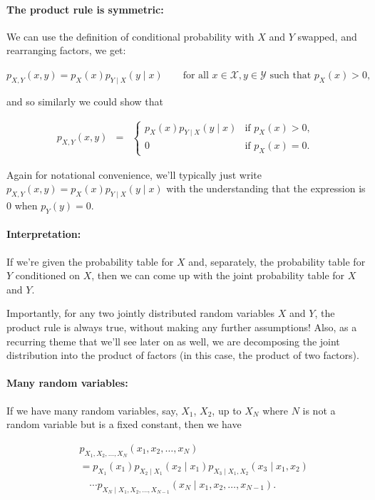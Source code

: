 \documentclass[6008notes.tex]{subfiles}
\begin{document}
\paragraph{The product rule is symmetric:} We can use the definition of conditional probability with $X$ and $Y$ swapped, and rearranging factors, we get:

{\centering$p_{X,Y}(x,y)=p_{X}(x)p_{Y\mid X}(y\mid x)\qquad \text {for all }x\in \mathcal{X},y\in \mathcal{Y}\text { such that }p_{X}(x)>0,$ \par}
 
and so similarly we could show that

\begin{eqnarray*}
p_{X,Y}(x,y)
&=&
\begin{cases}
p_{X}(x)p_{Y\mid X}(y\mid x) & \text{if }p_{X}(x)>0,\\
0 & \text{if }p_{X}(x)=0.
\end{cases}
\end{eqnarray*}

Again for notational convenience, we'll typically just write $p_{X,Y}(x,y)=p_{X}(x)p_{Y\mid X}(y\mid x)$ with the understanding that the expression is 0 when $p_{Y}(y)=0$.

\paragraph{Interpretation:} If we're given the probability table for $X$ and, separately, the probability table for $Y$ conditioned on $X$, then we can come up with the joint probability table for $X$ and $Y$.

Importantly, for any two jointly distributed random variables $X$ and $Y$, the product rule is always true, without making any further assumptions! Also, as a recurring theme that we'll see later on as well, we are decomposing the joint distribution into the product of factors (in this case, the product of two factors).

\paragraph{Many random variables:} If we have many random variables, say, $X_1$, $X_2$, up to $X_N$ where $N$ is not a random variable but is a fixed constant, then we have

\begin{eqnarray*}
&&p_{X_1, X_2, \dots ,X_N}(x_1, x_2, \dots, x_N) \\
&&=
  p_{X_1}(x_1)
  p_{X_2 \mid X_1}(x_2 \mid x_1)
  p_{X_3 \mid X_1, X_2}(x_3 \mid x_1, x_2) \\
&&\quad
  \cdots
  p_{X_N \mid X_1, X_2, \dots, X_{N-1}}(x_N \mid x_1, x_2, \dots, x_{N-1}).
\end{eqnarray*}
\end{document}
